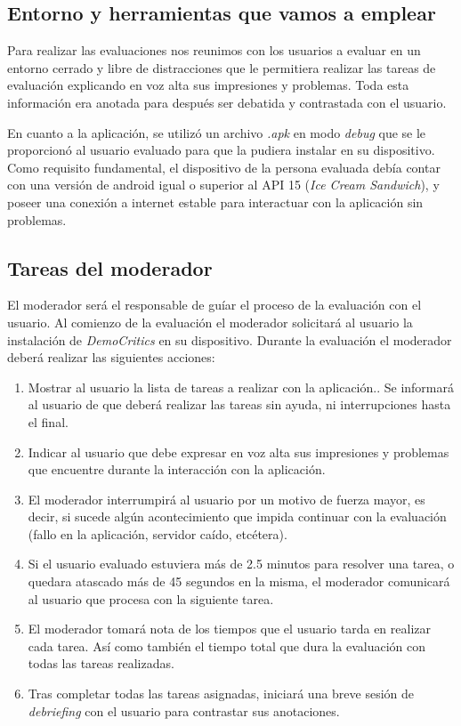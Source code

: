 \subsection{Entorno y herramientas que vamos a emplear}

Para realizar las evaluaciones nos reunimos con los usuarios a evaluar en un entorno cerrado y libre de distracciones que le permitiera realizar las tareas de evaluación explicando en voz alta sus impresiones y problemas. Toda esta información era anotada para después ser debatida y contrastada con el usuario.

En cuanto a la aplicación, se utilizó un archivo \textit{.apk} en modo \textit{debug} que se le proporcionó al usuario evaluado para que la pudiera instalar en su dispositivo. Como requisito fundamental, el dispositivo de la persona evaluada debía contar con una versión de android igual o superior al API 15 (\textit{Ice Cream Sandwich}), y poseer una conexión a internet estable para interactuar con la aplicación sin problemas.

\subsection{Tareas del moderador}

El moderador será el responsable de guíar el proceso de la evaluación con el usuario. Al comienzo de la evaluación el moderador solicitará al usuario la instalación de \textit{DemoCritics} en su dispositivo. Durante la evaluación el moderador deberá realizar las siguientes acciones:

\begin{enumerate}
 \item Mostrar al usuario la lista de tareas a realizar con la aplicación.. Se informará al usuario de que deberá realizar las tareas sin ayuda, ni interrupciones hasta el final.
 \item Indicar al usuario que debe expresar en voz alta sus impresiones y problemas que encuentre durante la interacción con la aplicación.
 \item El moderador interrumpirá al usuario por un motivo de fuerza mayor, es decir, si sucede algún acontecimiento que impida continuar con la evaluación (fallo en la aplicación, servidor caído, etcétera).
 \item Si el usuario evaluado estuviera más de 2.5 minutos para resolver una tarea, o quedara atascado más de 45 segundos en la misma, el moderador comunicará al usuario que procesa con la siguiente tarea.
 \item El moderador tomará nota de los tiempos que el usuario tarda en realizar cada tarea. Así como también el tiempo total que dura la evaluación con todas las tareas realizadas.
 \item Tras completar todas las tareas asignadas, iniciará una breve sesión de \textit{debriefing} con el usuario para contrastar sus anotaciones.
\end{enumerate}

